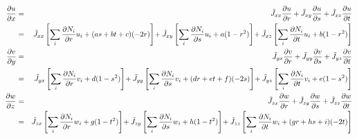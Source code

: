\begin{eqnarray}
\frac{\partial u}{\partial x} 
&=& \tilde{J}_{xx} \frac{\partial u}{\partial r} 
+\tilde{J}_{xy} \frac{\partial u}{\partial s}
+\tilde{J}_{xz} \frac{\partial u}{\partial t} \nn\\
&=&  \tilde{J}_{xx} \left[\sum_i \frac{\partial N_i}{\partial r} u_i + (a s + b t +c)(-2r)  \right]\! %
+\tilde{J}_{xy} \left[\sum_i \frac{\partial N_i}{\partial s} u_i + a (1-r^2)  \right]\! %
+\tilde{J}_{xz} \left[\sum_i \frac{\partial N_i}{\partial t} u_i + b (1-r^2)  \right]
\nn\\
\frac{\partial v}{\partial y} 
&=& \tilde{J}_{yx} \frac{\partial v}{\partial r} 
+\tilde{J}_{yy} \frac{\partial v}{\partial s}
+\tilde{J}_{yz} \frac{\partial v}{\partial t} \nn\\
&=&  \tilde{J}_{yx} \left[\sum_i \frac{\partial N_i}{\partial r} v_i + d (1-s^2)  \right]\!
+\tilde{J}_{yy} \left[\sum_i \frac{\partial N_i}{\partial s} v_i + (d r + e t +f)(-2s) \right]\!
+\tilde{J}_{yz} \left[\sum_i \frac{\partial N_i}{\partial t} v_i + e (1-s^2)  \right] 
\nn\\
\frac{\partial w}{\partial z} 
&=& \tilde{J}_{zx} \frac{\partial w}{\partial r} 
+\tilde{J}_{zy} \frac{\partial w}{\partial s}
+\tilde{J}_{zz} \frac{\partial w}{\partial t} \nn\\
&=&  \tilde{J}_{zx} \left[\sum_i \frac{\partial N_i}{\partial r} w_i + g (1-t^2)  \right]\! 
+\tilde{J}_{zy} \left[\sum_i \frac{\partial N_i}{\partial s} w_i + h (1-t^2) \right] \! 
+\tilde{J}_{zz} \left[\sum_i \frac{\partial N_i}{\partial t} w_i + (g r + h s +i)(-2t)  \right] \nn
\end{eqnarray}

